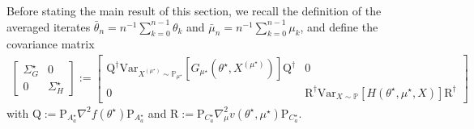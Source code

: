 \documentclass[11pt,a4paper]{article}
\theoremstyle{definition}
\newcommand{\defn}{:=}
\begin{document}
Before stating the main result of this section, we recall the definition of the averaged iterates $\bar{\theta}_n = n^{-1} \sum_{k=0}^{n-1} \theta_k$ and $\bar{\mu}_n = n^{-1} \sum_{k=0}^{n-1} \mu_k$, and define the covariance matrix
\begin{align}
\label{eq:Sigma12}
    \begin{bmatrix}
        \Sigma_G^\star & 0 \\ 0 & \Sigma_H^\star
    \end{bmatrix}
    \defn\begin{bmatrix}
        \text{Q}^\dagger \text{Var}_{X^{(\mu^\star)} \sim \mathbb P_{\mu^\star}}\left[ G_{\mu^\star}(\theta^\star,X^{(\mu^\star)})\right] \text{Q}^\dagger & 0 \\ 0 & \text{R}^\dagger \text{Var}_{X \sim \mathbb P}\left[ H(\theta^\star, \mu^\star, X)\right] \text{R}^\dagger
    \end{bmatrix}
\end{align}
with $\text{Q} \defn \text{P}_{A^\star_{a}}\nabla^2  f(\theta^\star) \text{P}_{A^\star_{a}}$ and $\text{R} \defn \text{P}_{C^\star_{a}}\nabla_\mu^2 v(\theta^\star,\mu^\star) \text{P}_{C^\star_{a}}$. 
\end{document}

